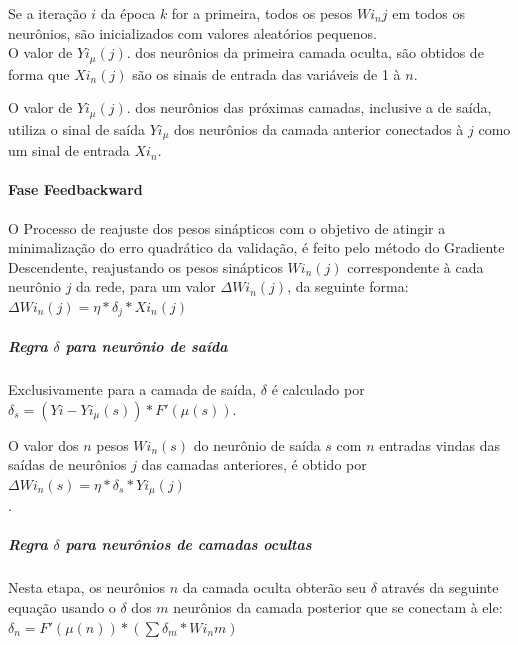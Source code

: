 \documentclass[	12pt, Times, openright, twoside, a4paper, english, brazil]{abntex2}
\begin{document}
            Se a iteração $i$ da época $k$ for a primeira, todos os pesos $Wi_{n}j$ em todos os neurônios, são inicializados com valores aleatórios pequenos.\\ 
            
            O valor de $Yi_{\mu}(j)$. dos neurônios da primeira camada oculta, são obtidos de forma que $Xi_{n}(j)$ são os sinais de entrada das variáveis de 1 à $n$.
            
            O valor de $Yi_{\mu}(j)$. dos neurônios das próximas camadas, inclusive a de saída, utiliza o sinal de saída $Yi_{\mu}$ dos neurônios da camada anterior conectados à $j$ como um sinal de entrada $Xi_{n}$.
            
            \paragraph*{Fase Feedbackward}
            O Processo de reajuste dos pesos sinápticos com o objetivo de atingir a minimalização do erro quadrático da validação, é feito pelo método do Gradiente Descendente, reajustando os pesos sinápticos $Wi_{n}(j)$ correspondente à cada neurônio $j$ da rede, para um valor $\Delta Wi_{n}(j)$, da seguinte forma:\\
            $\Delta Wi_{n}(j) = \eta*\delta_j*Xi_{n}(j)$\\
            
            \subparagraph*{Regra $\delta$ para neurônio de saída}
            Exclusivamente para a camada de saída, $\delta$ é calculado por\\
            $\delta_s = (Yi - Yi_{\mu}(s) )*F'(\mu(s))$.
            
            O valor dos $n$ pesos $Wi_{n}(s)$ do neurônio de saída $s$ com $n$ entradas vindas das saídas de neurônios $j$ das camadas anteriores, é obtido por $\Delta Wi_{n}(s) = \eta*\delta_s*Yi_{\mu}(j)$\\.

           \subparagraph*{Regra $\delta$ para neurônios de camadas ocultas}
            Nesta etapa, os neurônios $n$ da camada oculta obterão seu $\delta$ através da seguinte equação usando o $\delta$ dos $m$ neurônios da camada posterior que se conectam à ele:\\ 
            
            $\delta_n = F'(\mu(n))*(\sum \delta_m*Wi_{n}m)$\\
            
\end{document}
